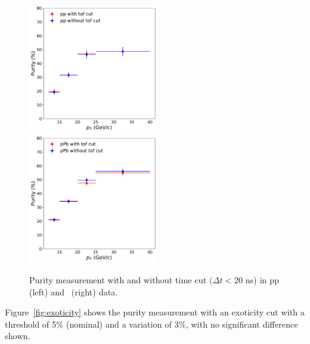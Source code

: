 \begin{figure}
	\center
	\includegraphics[width=0.495\textwidth]{Checks_Systematics/pptof.pdf}
	\includegraphics[width=0.495\textwidth]{Checks_Systematics/ppbtof.pdf}
	\caption{Purity measurement with and without time cut $(\Delta t<20$ ns) in pp (left) and \pPb~(right) data.}
	\label{fig:TOF_purity}
\end{figure}

Figure~\ref{fig:exoticity} shows the purity measurement with an exoticity cut with a threshold of 5\% (nominal) and a variation of $3\%$, with no significant difference shown. 

